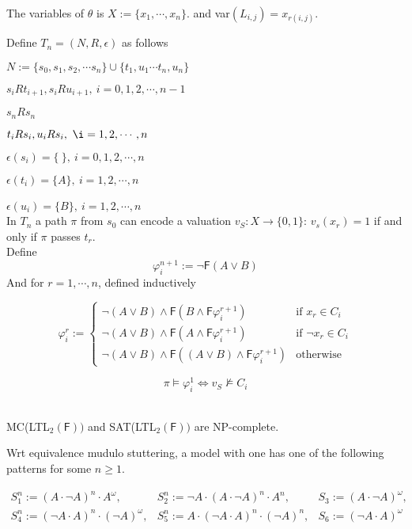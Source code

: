 \documentclass[12pt]{article}
\begin{document}
\begin{CJK*}{GBK}{song}
The variables of $\theta$ is $X:=\{x_1,\cdots, x_n\}$. and var$(L_{i,j})=x_{r(i,j)}$.

Define $T_n=(N,R,\epsilon)$ as follows

$N:=\{s_0, s_1,s_2,\cdots s_n\}\cup\{t_1, u_1\cdots t_n, u_n\}$

$s_iR t_{i+1}, s_iRu_{i+1}, \ i=0,1,2,\cdots,n-1$

$s_n R s_n$

$t_iR s_{i}, u_{i}R s_{i}, \ \i=1,2,\cdots,n$


$\epsilon(s_i)=\{ \ \}, \ i=0,1,2,\cdots,n$

$\epsilon(t_i)=\{A\},\ i=1,2,\cdots,n$

$\epsilon(u_i)=\{B\}, \ i=1,2,\cdots,n$
\ \\

In $T_n$ a path $\pi$ from $s_0$ can encode a valuation $v_S:X\rightarrow\{0,1\}$: $v_s(x_r)=1$ if and only if $\pi$ passes $t_r$. \\

Define $$\varphi_i^{n+1}:=\neg \textsf{F}(A\vee B)$$
And for $r=1,\cdots,n$, defined inductively

$$\varphi^r_i:=\left\{
\begin{array}{ll}
\neg(A\vee B)\wedge \textsf{F}(B\wedge\textsf{F}\varphi_i^{r+1}) & \mbox{if }x_r\in C_i\\
\neg(A\vee B)\wedge \textsf{F}(A\wedge\textsf{F}\varphi_i^{r+1}) & \mbox{if }\neg x_r\in C_i\\
\neg(A\vee B)\wedge \textsf{F}((A\vee B)\wedge\textsf{F}\varphi_i^{r+1}) & \mbox{otherwise}
\end{array}\right.
$$

$$\pi\models\varphi^1_i\Longleftrightarrow v_S\not\models C_i$$

\ \\

MC(LTL$_2(\textsf{F}))$ and SAT(LTL$_2(\textsf{F}))$ are NP-complete.



Wrt equivalence mudulo stuttering, a model with one has one of the following patterns for some $n\geq 1$.

$$\begin{array}{lll}
S^n_1:=(A\cdot \neg A)^n\cdot A^{\omega}, & S^n_2:=\neg A\cdot (A\cdot\neg A)^n\cdot A^n, & S_3:=(A\cdot\neg A)^\omega,\\

S^n_4:=(\neg A\cdot A)^n\cdot (\neg A)^{\omega}, & S^n_5:=A\cdot (\neg A\cdot A)^n\cdot (\neg A)^n, & S_6:=(\neg A\cdot A)^\omega
\end{array}
$$


\end{CJK*}
\end{document}
